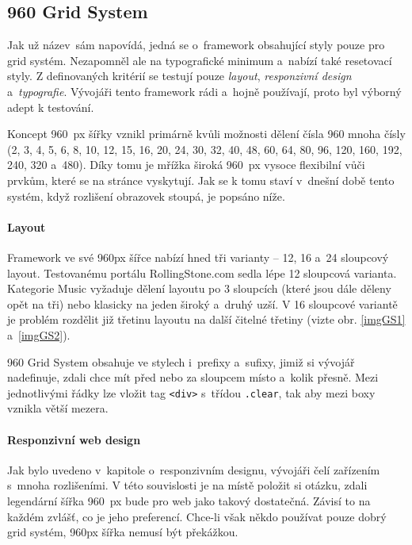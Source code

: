 \documentclass[thesis=B,czech]{FITthesis}[2012/06/26]
\begin{document}
\subsection{960 Grid System} \label{sec:gs}

Jak už název~sám napovídá, jedná se o~framework obsahující styly pouze pro grid  systém. Nezapomněl ale na typografické minimum a~nabízí také resetovací styly. Z definovaných kritérií se testují pouze \textit{layout}, \textit{responzivní design} a~\textit{typografie}. Vývojáři tento framework rádi a~hojně používají, proto byl výborný adept k testování.

Koncept 960~px šířky vznikl primárně kvůli možnosti dělení čísla 960 mnoha čísly (2, 3, 4, 5, 6, 8, 10, 12, 15, 16, 20, 24, 30, 32, 40, 48, 60, 64, 80, 96, 120, 160, 192, 240, 320 a~480). Díky tomu je mřížka široká 960~px vysoce flexibilní vůči prvkům, které se na stránce vyskytují. Jak se k tomu staví v~dnešní době tento systém, když rozlišení obrazovek stoupá, je popsáno níže.

\paragraph{Layout}

Framework ve své 960px šířce nabízí hned tři varianty -- 12, 16 a~24 sloupcový layout. Testovanému portálu RollingStone.com sedla lépe 12 sloupcová varianta. Kategorie Music vyžaduje dělení layoutu po 3 sloupcích (které jsou dále děleny opět na tři) nebo klasicky na jeden široký a~druhý uzší. V 16 sloupcové variantě je problém rozdělit již třetinu layoutu na další čitelné třetiny (vizte obr. \ref{imgGS1} a~\ref{imgGS2}).



960 Grid System obsahuje ve stylech i~prefixy a~sufixy, jimiž si vývojář nadefinuje, zdali chce mít před nebo za sloupcem místo a~kolik přesně. Mezi jednotlivými řádky lze vložit tag \verb#<div># s~třídou \verb#.clear#, tak aby mezi boxy vznikla větší mezera.

\paragraph{Responzivní web design}

Jak bylo uvedeno v~kapitole o~responzivním designu, vývojáři čelí zařízením s~mnoha rozlišeními. V této souvislosti je na místě položit si otázku, zdali legendární šířka 960~px bude pro web jako takový dostatečná. Závisí to na každém zvlášť, co je jeho preferencí. Chce-li však někdo používat pouze dobrý grid  systém, 960px šířka nemusí být překážkou. 
\end{document}
